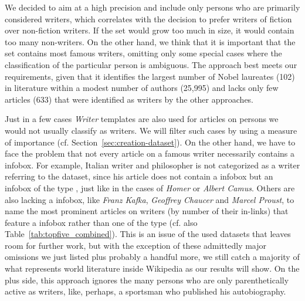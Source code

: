 \documentclass[a4paper,12pt]{scrartcl}
\begin{document}
We decided to aim at a high precision and include only persons who are
primarily considered writers, which correlates with the decision to
prefer writers of fiction over non-fiction writers. If the set would
grow too much in size, it would contain too many non-writers. On the
other hand, we think that it is important that the set contains most
famous writers, omitting only some special cases where the
classification of the particular person is ambiguous. 
%
%
%
The \apInfoboxesEn approach best meets our requirements, given that it
identifies the largest number of Nobel laureates (102) in literature
within a modest number of authors (25,995) and lacks only few
articles (633) that were identified as writers by the other
approaches.


Just in a few cases \emph{Writer} templates are also used for
articles on persons we would not usually classify as writers. We will
filter such cases by using a measure of importance
(cf. Section~\ref{sec:creation-dataset}).
%
On the other hand, we have to face the problem that not every article
on a famous writer necessarily contains a 
infobox. For example, Italian writer and philosopher  is not categorized as a writer referring to the
 dataset, since his article does not
contain a  infobox but an infobox of the type
, just like in the cases of \emph{Homer} or
\emph{Albert Camus}. Others are also lacking a 
infobox, like \emph{Franz Kafka}, \emph{Geoffrey
  Chaucer} and \emph{Marcel Proust}, to name the most prominent
articles on writers (by number of their in-links) that feature a
 infobox rather than one of the  type
(cf. also Table~\ref{tab:topfive_combined}). This is an issue of the
used datasets that leaves room for further work, but with the
exception of these admittedly major omissions we just listed plus
probably a handful more, we still catch a majority of what represents
world literature inside Wikipedia as our results will show.  On the
plus side, this approach ignores the many persons who are only
parenthetically active as writers, like, perhaps, a sportsman who
published his autobiography.
%
\end{document}
